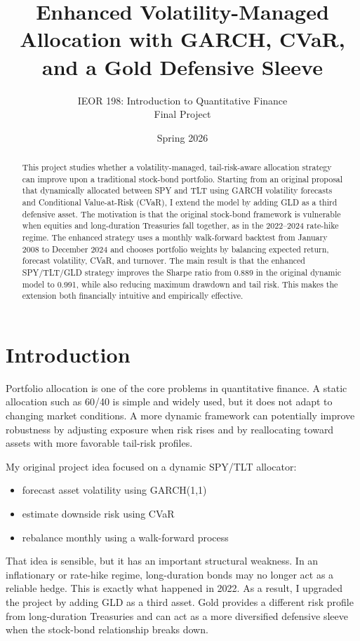 \documentclass[11pt]{article}
\title{Enhanced Volatility-Managed Allocation with GARCH, CVaR, and a Gold Defensive Sleeve}
\author{
\normalsize IEOR 198: Introduction to Quantitative Finance \\
\normalsize Final Project
}
\date{Spring 2026}
\begin{document}
\maketitle
\thispagestyle{fancy}

\begin{abstract}
This project studies whether a volatility-managed, tail-risk-aware allocation strategy can improve upon a traditional stock-bond portfolio. Starting from an original proposal that dynamically allocated between SPY and TLT using GARCH volatility forecasts and Conditional Value-at-Risk (CVaR), I extend the model by adding GLD as a third defensive asset. The motivation is that the original stock-bond framework is vulnerable when equities and long-duration Treasuries fall together, as in the 2022--2024 rate-hike regime. The enhanced strategy uses a monthly walk-forward backtest from January 2008 to December 2024 and chooses portfolio weights by balancing expected return, forecast volatility, CVaR, and turnover. The main result is that the enhanced SPY/TLT/GLD strategy improves the Sharpe ratio from 0.889 in the original dynamic model to 0.991, while also reducing maximum drawdown and tail risk. This makes the extension both financially intuitive and empirically effective.
\end{abstract}

\section{Introduction}
Portfolio allocation is one of the core problems in quantitative finance. A static allocation such as 60/40 is simple and widely used, but it does not adapt to changing market conditions. A more dynamic framework can potentially improve robustness by adjusting exposure when risk rises and by reallocating toward assets with more favorable tail-risk profiles.

My original project idea focused on a dynamic SPY/TLT allocator:
\begin{itemize}
    \item forecast asset volatility using GARCH(1,1)
    \item estimate downside risk using CVaR
    \item rebalance monthly using a walk-forward process
\end{itemize}

That idea is sensible, but it has an important structural weakness. In an inflationary or rate-hike regime, long-duration bonds may no longer act as a reliable hedge. This is exactly what happened in 2022. As a result, I upgraded the project by adding GLD as a third asset. Gold provides a different risk profile from long-duration Treasuries and can act as a more diversified defensive sleeve when the stock-bond relationship breaks down.
\end{document}
